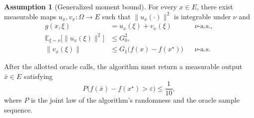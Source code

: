 \documentclass[10pt]{article}
\theoremstyle{definition}
\newtheorem{assumption}{Assumption}
\begin{document}
\begin{assumption}[Generalized moment bound]
For every $x\in E$, there exist measurable maps $u_x,v_x:\Omega\to E$ such that $\|u_x(\cdot)\|^2$ is integrable under $\nu$ and
\[
\begin{aligned}
g(x,\xi)&=u_x(\xi)+v_x(\xi)
&&\nu\text{-a.s.},\\
\mathbb{E}_{\xi\sim\nu}\bigl[\|u_x(\xi)\|^2\bigr]&\leq G_0^2,\\
\|v_x(\xi)\|&\leq G_1\bigl(f(x)-f(x^\star)\bigr)
&&\nu\text{-a.s.}
\end{aligned}
\]
\end{assumption}

After the allotted oracle calls, the algorithm must return a measurable output $\bar{x}\in E$ satisfying
\[
P\bigl(f(\bar{x})-f(x^\star)>\varepsilon\bigr)\leq\frac{1}{10},
\]
where $P$ is the joint law of the algorithm's randomness and the oracle sample sequence.
\end{document}
